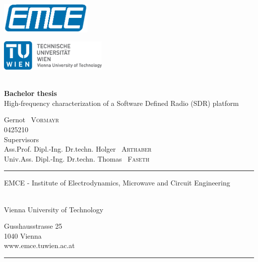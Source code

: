 \documentclass[12pt,a4paper,parskip=full]{scrartcl}
\begin{document}
\begin{titlepage}
    \enlargethispage{1cm}
    \centering
    \begin{minipage}{0.49\linewidth}
        \includegraphics[height=1.5cm,keepaspectratio]{EMCE_Logo_CMYK_color}
    \end{minipage}
    \begin{minipage}{0.49\linewidth}
        \flushright
        \includegraphics[height=1.5cm,keepaspectratio]{TULogo_CMYK}
    \end{minipage}\\
    \vspace*{5cm}
    {\Huge \textbf{Bachelor thesis}}\\
    \vspace*{1cm}
    {\Large High-frequency characterization of a Software Defined Radio (SDR) platform}

    \vspace*{2cm}
    {\large Gernot ~\textsc{Vormayr} ~\\ 0425210 } ~\\ 

    \vfill
    {Supervisors} ~\\\vspace*{0.1cm}
    {Ass.Prof. Dipl.-Ing. Dr.techn. \large Holger ~\textsc{Arthaber}} ~\\
    {Univ.Ass. Dipl.-Ing. Dr.techn. \large Thomas ~\textsc{Faseth}}
    \vspace*{2cm}

    \rule{\linewidth}{0.4pt}
    \begin{minipage}[t]{0.55\linewidth}
        \flushleft
        \begin{large}
            EMCE - Institute of Electrodynamics, Microwave and Circuit Engineering
        \end{large}\\
        Vienna University of Technology
    \end{minipage}
    \hfill
    \begin{minipage}[t]{0.27\linewidth}
        \flushright
        Gusshausstrasse 25\\
        1040 Vienna\\
        www.emce.tuwien.ac.at
    \end{minipage}
    \vspace*{-3pt}
    \rule{\linewidth}{0.4pt}
    \clearpage
\end{titlepage}
\end{document}
